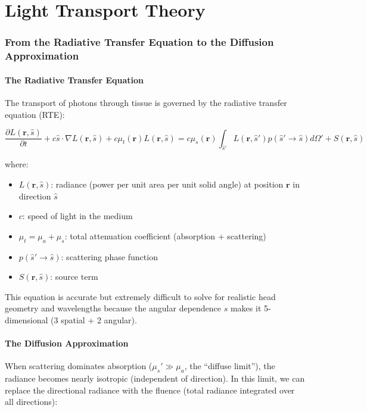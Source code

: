 \documentclass[12pt]{article}
\def\,{ }%
\begin{document}
\newpage
\part{Light Transport Theory}

\section{From the Radiative Transfer Equation to the Diffusion Approximation}

\subsection{The Radiative Transfer Equation}

The transport of photons through tissue is governed by the radiative transfer equation (RTE):

\begin{equation}
\frac{\partial L(\mathbf{r}, \hat{s})}{\partial t} + c \, \hat{s} \cdot \nabla L(\mathbf{r}, \hat{s}) + c \, \mu_t(\mathbf{r}) \, L(\mathbf{r}, \hat{s}) = c \, \mu_s(\mathbf{r}) \int_{\hat{s}'} L(\mathbf{r}, \hat{s}') \, p(\hat{s}' \to \hat{s}) \, d\Omega' + S(\mathbf{r}, \hat{s})
\end{equation}

where:
\begin{itemize}
\item $L(\mathbf{r}, \hat{s})$: radiance (power per unit area per unit solid angle) at position $\mathbf{r}$ in direction $\hat{s}$
\item $c$: speed of light in the medium
\item $\mu_t = \mu_a + \mu_s$: total attenuation coefficient (absorption + scattering)
\item $p(\hat{s}' \to \hat{s})$: scattering phase function
\item $S(\mathbf{r}, \hat{s})$: source term
\end{itemize}

This equation is accurate but extremely difficult to solve for realistic head geometry and wavelengths because the angular dependence $\hat{s}$ makes it 5-dimensional (3 spatial + 2 angular).

\subsection{The Diffusion Approximation}

When scattering dominates absorption ($\mu_s' \gg \mu_a$, the ``diffuse limit''), the radiance becomes nearly isotropic (independent of direction). In this limit, we can replace the directional radiance with the fluence (total radiance integrated over all directions):
\end{document}
